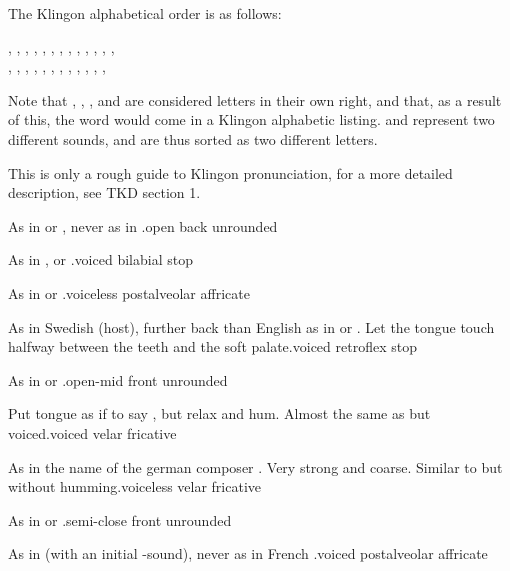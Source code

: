 
\noindent The Klingon alphabetical order is as follows:

\begin{center}
, , , , , , , , ,
, , , , \\
, , , , , , , , ,
, , , 
\end{center}

\noindent Note that , , ,  and  are
considered letters in their own right, and that, as a result of this,
the word  would come   in a Klingon
alphabetic listing.  and  represent two different sounds, and
are thus sorted as two different letters.

This is only a rough guide to Klingon pronunciation, for a more
detailed description, see TKD section 1.

\vspace{3mm}

%
  {\textipa{[A]} As in  or , never as in
  .}{open back unrounded}


%
  {\textipa{[b]} As in ,  or
  .}{voiced bilabial stop}

%
  {\textipa{[\t{tS}]} As in  or
  .}{voiceless postalveolar affricate}

%
  {\textipa{[\:d]} As in Swedish  (host), further back
  than English  as in  or . Let the
  tongue touch halfway between the teeth and the soft palate.}{voiced
  retroflex stop}

%
  {\textipa{[E]} As in  or .}{open-mid front
  unrounded}

%
  {\textipa{[G]} Put tongue as if to say , but relax and
  hum. Almost the same as  but voiced.}{voiced velar fricative}

%
  {\textipa{[x]} As in the name of the german composer
  . Very strong and coarse. Similar to  but without
  humming.}{voiceless velar fricative}

%
  {\textipa{[I]} As in  or .}{semi-close
  front unrounded}


%
  {\textipa{[\t{dZ}]} As in  (with an initial
  -sound), never as in French .}{voiced postalveolar
  affricate}

